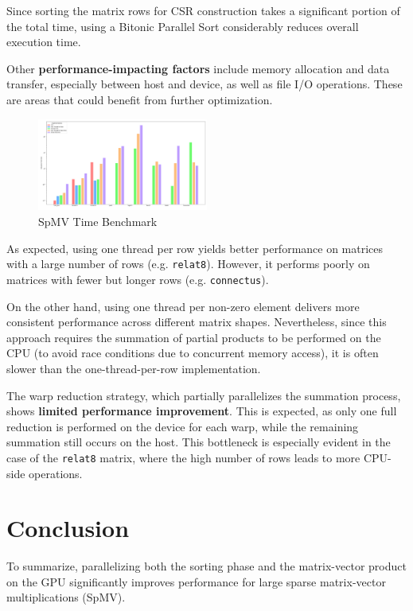 \documentclass[conference]{IEEEtran}
\begin{document}
    Since sorting the matrix rows for CSR construction takes a significant
    portion of the total time, using a Bitonic Parallel Sort considerably
    reduces overall execution time.

    Other \textbf{performance-impacting factors} include memory allocation and
    data transfer, especially between host and device, as well as file I/O
    operations.
    These are areas that could benefit from further optimization.

    \begin{figure}[ht]
        \caption{SpMV Time Benchmark}
        \centering
        \includegraphics[width=0.5\textwidth]{spmv-benchmark.png}
    \end{figure}

    As expected, using one thread per row yields better performance on matrices
    with a large number of rows (e.g. \texttt{relat8}).
    However, it performs poorly on matrices with fewer but longer rows (e.g.
    \texttt{connectus}).

    On the other hand, using one thread per non-zero element delivers more
    consistent performance across different matrix shapes.
    Nevertheless, since this approach requires the summation of partial
    products to be performed on the CPU (to avoid race conditions due to
    concurrent memory access), it is often slower than the one-thread-per-row
    implementation.

    The warp reduction strategy, which partially parallelizes the summation
    process, shows \textbf{limited performance improvement}.
    This is expected, as only one full reduction is performed on the device for
    each warp, while the remaining summation still occurs on the host.
    This bottleneck is especially evident in the case of the \texttt{relat8}
    matrix, where the high number of rows leads to more CPU-side operations.

    \section{Conclusion}

    To summarize, parallelizing both the sorting phase and the matrix-vector
    product on the GPU significantly improves performance for large sparse
    matrix-vector multiplications (SpMV).
\end{document}
